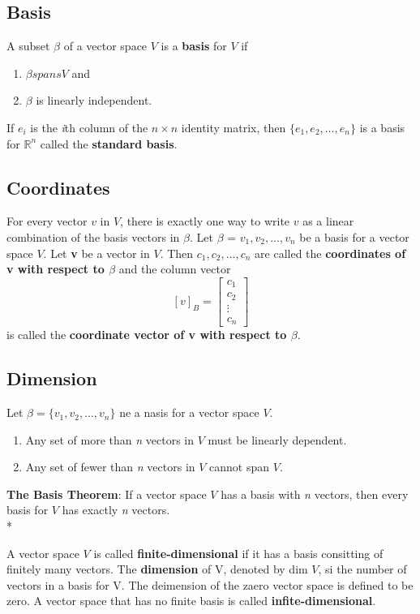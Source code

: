 \subsection*{Basis}
A subset $\beta$ of a vector space $V$ is a \textbf{basis} for $V$ if 
\begin{enumerate}
    \item $\beta spans V$ and 
    \item $\beta$ is linearly independent.
\end{enumerate}
If \textbf{$e_i$} is the \textit{i}th column of the $n\times n$ identity matrix, then $\{e_1, e_2, \dots, e_n\}$ is a basis for $\mathbb{R}^n$ called the \textbf{standard basis}.

\subsection*{Coordinates}
For every vector $v$ in $V$, there is exactly one way to write $v$ as a linear combination of the basis vectors in $\beta$.
Let $\beta$ = ${v_1, v_2, \dots, v_n}$ be a basis for a vector space $V$. Let \textbf{v} be a vector in $V$. Then $c_1, c_2, \dots, c_n$ are called the \textbf{coordinates of v with respect to $\beta$} and the column vector\\
$$[v]_B = \begin{bmatrix}
    c_1\\c_2\\\vdots\\c_n
\end{bmatrix}$$ is called the \textbf{coordinate vector of v with respect to $\beta$}.

\subsection*{Dimension}
Let $\beta = \{v_1, v_2,\dots, v_n\}$ ne a nasis for a vector space $V$.
\begin{enumerate}
    \item Any set of more than \textit{n} vectors in $V$ must be linearly dependent.
    \item Any set of fewer than \textit{n} vectors in $V$ cannot span $V$.
\end{enumerate}
\textbf{The Basis Theorem}: If a vector space $V$ has a basis with \textit{n} vectors, then every basis for $V$ has exactly \textit{n} vectors.\\*

A vector space $V$ is called \textbf{finite-dimensional} if it has a basis consitting of finitely many vectors. The \textbf{dimension} of V, denoted by dim $V$, si the number of vectors in a basis for V. The deimension of the zaero vector space is defined to be zero. A vector space that has no finite basis is called \textbf{infite-dimensional}.

